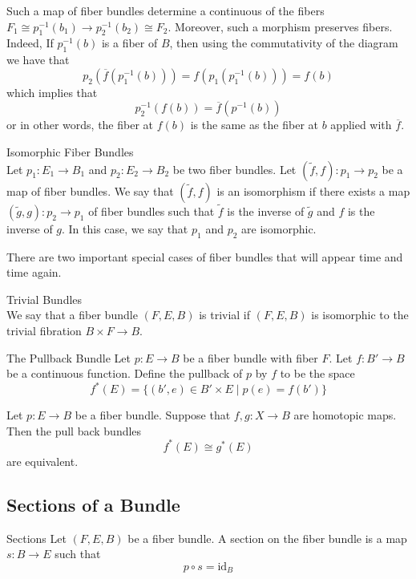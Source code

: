 \documentclass[a4paper]{article}
\begin{document}
Such a map of fiber bundles determine a continuous of the fibers $F_1\cong p_1^{-1}(b_1)\to p_2^{-1}(b_2)\cong F_2$. Moreover, such a morphism preserves fibers. Indeed, If $p_1^{-1}(b)$ is a fiber of $B$, then using the commutativity of the diagram we have that $$p_2(\overline{f}(p_1^{-1}(b)))=f(p_1(p_1^{-1}(b)))=f(b)$$ which implies that $$p_2^{-1}(f(b))=\overline{f}(p^{-1}(b))$$ or in other words, the fiber at $f(b)$ is the same as the fiber at $b$ applied with $\overline{f}$. 

\begin{defn}{Isomorphic Fiber Bundles}{}\\
Let $p_1:E_1\to B_1$ and $p_2:E_2\to B_2$ be two fiber bundles. Let $(\widetilde{f},f):p_1\to p_2$ be a map of fiber bundles. We say that $(\widetilde{f},f)$ is an isomorphism if there exists a map $(\widetilde{g},g):p_2\to p_1$ of fiber bundles such that $\widetilde{f}$ is the inverse of $\widetilde{g}$ and $f$ is the inverse of $g$. In this case, we say that $p_1$ and $p_2$ are isomorphic. 
\end{defn}

There are two important special cases of fiber bundles that will appear time and time again. 

\begin{defn}{Trivial Bundles}{}\\
We say that a fiber bundle $(F,E,B)$ is trivial if $(F,E,B)$ is isomorphic to the trivial fibration $B\times F\to B$. 
\end{defn}

\begin{defn}{The Pullback Bundle}{} Let $p:E\to B$ be a fiber bundle with fiber $F$. Let $f:B'\to B$ be a continuous function. Define the pullback of $p$ by $f$ to be the space $$f^\ast(E)=\{(b',e)\in B'\times E\;|\;p(e)=f(b')\}$$
\end{defn}

\begin{thm}{}{} Let $p:E\to B$ be a fiber bundle. Suppose that $f,g:X\to B$ are homotopic maps. Then the pull back bundles $$f^\ast(E)\cong g^\ast(E)$$ are equivalent. 
\end{thm}

\subsection{Sections of a Bundle}
\begin{defn}{Sections}{} Let $(F,E,B)$ be a fiber bundle. A section on the fiber bundle is a map $s:B\to E$ such that $$p\circ s=\text{id}_B$$
\end{defn}
\end{document}
